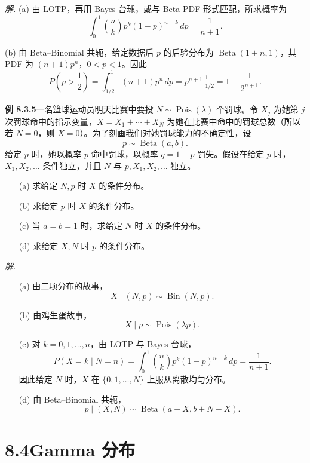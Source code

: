 \documentclass[UTF8,12pt,a4paper,fontset=fandol]{ctexart}
\begin{document}
\noindent\textit{解.}\quad
(a) 由 LOTP，再用 Bayes 台球，或与 Beta PDF 形式匹配，所求概率为
\[
  \int_0^1 {n\choose k}p^k(1-p)^{n-k}\,dp=\frac{1}{n+1}.
\]

(b) 由 Beta--Binomial 共轭，给定数据后 $p$ 的后验分布为 $\operatorname{Beta}(1+n,1)$，其 PDF 为 $(n+1)p^n$，$0<p<1$。因此
\[
  P\left(p>\frac12\right)
  =\int_{1/2}^1 (n+1)p^n\,dp
  =p^{n+1}\bigg|_{1/2}^{1}
  =1-\frac{1}{2^{n+1}}.
\]

\noindent\textbf{例 8.3.5}\quad 一名篮球运动员明天比赛中要投 $N\sim\operatorname{Pois}(\lambda)$ 个罚球。令 $X_j$ 为她第 $j$ 次罚球命中的指示变量，$X=X_1+\cdots+X_N$ 为她在比赛中命中的罚球总数（所以若 $N=0$，则 $X=0$）。为了刻画我们对她罚球能力的不确定性，设
\[
  p\sim\operatorname{Beta}(a,b).
\]
给定 $p$ 时，她以概率 $p$ 命中罚球，以概率 $q=1-p$ 罚失。假设在给定 $p$ 时，$X_1,X_2,\ldots$ 条件独立，并且 $N$ 与 $p,X_1,X_2,\ldots$ 独立。

\begin{enumerate}
  \item[(a)] 求给定 $N,p$ 时 $X$ 的条件分布。
  \item[(b)] 求给定 $p$ 时 $X$ 的条件分布。
  \item[(c)] 当 $a=b=1$ 时，求给定 $N$ 时 $X$ 的条件分布。
  \item[(d)] 求给定 $X,N$ 时 $p$ 的条件分布。
\end{enumerate}

\noindent\textit{解.}\quad
\begin{enumerate}
  \item[(a)] 由二项分布的故事，
  \[
    X\mid(N,p)\sim\operatorname{Bin}(N,p).
  \]

  \item[(b)] 由鸡生蛋故事，
  \[
    X\mid p\sim\operatorname{Pois}(\lambda p).
  \]

  \item[(c)] 对 $k=0,1,\ldots,n$，由 LOTP 与 Bayes 台球，
  \[
    P(X=k\mid N=n)
    =\int_0^1 {n\choose k}p^k(1-p)^{n-k}\,dp
    =\frac{1}{n+1}.
  \]
  因此给定 $N$ 时，$X$ 在 $\{0,1,\ldots,N\}$ 上服从离散均匀分布。

  \item[(d)] 由 Beta--Binomial 共轭，
  \[
    p\mid(X,N)\sim\operatorname{Beta}(a+X,b+N-X).
  \]
\end{enumerate}

\section*{8.4\quad Gamma 分布}
\end{document}
